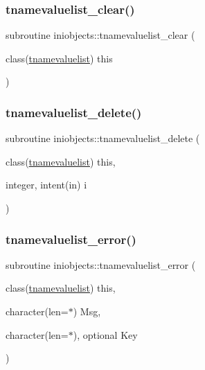 \subsubsection{\texorpdfstring{tnamevaluelist\+\_\+clear()}{tnamevaluelist\_clear()}}
{\footnotesize\ttfamily subroutine iniobjects\+::tnamevaluelist\+\_\+clear (\begin{DoxyParamCaption}\item[{class(\mbox{\hyperlink{structiniobjects_1_1tnamevaluelist}{tnamevaluelist}})}]{this }\end{DoxyParamCaption})\hspace{0.3cm}{\ttfamily [private]}}

\mbox{\label{namespaceiniobjects_a7846fce943c898567326478e49f7741f}} 
\subsubsection{\texorpdfstring{tnamevaluelist\+\_\+delete()}{tnamevaluelist\_delete()}}
{\footnotesize\ttfamily subroutine iniobjects\+::tnamevaluelist\+\_\+delete (\begin{DoxyParamCaption}\item[{class(\mbox{\hyperlink{structiniobjects_1_1tnamevaluelist}{tnamevaluelist}})}]{this,  }\item[{integer, intent(in)}]{i }\end{DoxyParamCaption})\hspace{0.3cm}{\ttfamily [private]}}

\mbox{\label{namespaceiniobjects_a24c1905bc9b561d8eeb12877f6a8cca3}} 
\subsubsection{\texorpdfstring{tnamevaluelist\+\_\+error()}{tnamevaluelist\_error()}}
{\footnotesize\ttfamily subroutine iniobjects\+::tnamevaluelist\+\_\+error (\begin{DoxyParamCaption}\item[{class(\mbox{\hyperlink{structiniobjects_1_1tnamevaluelist}{tnamevaluelist}})}]{this,  }\item[{character(len=$\ast$)}]{Msg,  }\item[{character(len=$\ast$), optional}]{Key }\end{DoxyParamCaption})\hspace{0.3cm}{\ttfamily [private]}}

